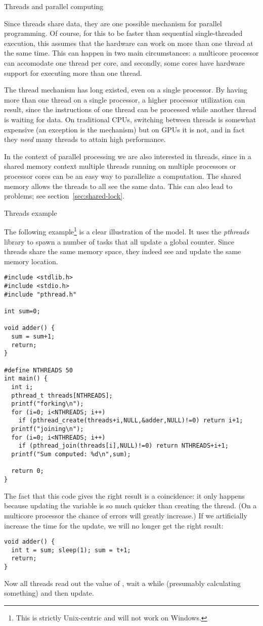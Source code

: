  {Threads and parallel computing}

Since threads share data, they are one possible mechanism for parallel programming.
Of course, for this to be faster than sequential single-threaded execution,
this assumes that the hardware can work on more than one
thread at the same time. This can happen in two main circumstances:
a multicore processor can accomodate one thread per core,
and secondly, some cores have hardware support for executing more
than one thread.

The thread mechanism has long existed, even on a single processor. By having more
than one thread on a single processor, a higher processor utilization
can result, since the instructions of one thread can be processed
while another thread is waiting for data.  On traditional CPUs,
switching between threads is somewhat expensive (an exception is the
 mechanism) but on \acp{GPU} it is not, and
in fact they \emph{need} many threads to attain high performance.

In the context of parallel processing we are also interested in
threads, since in a shared memory context multiple threads running on
multiple processors or processor cores can be an easy way to
parallelize a computation. The shared memory allows the threads to all
see the same data. This can also lead to problems; see
section~\ref{sec:shared-lock}.

 {Threads example}
\label{sec:thread-example}

The following example\footnote{This is strictly Unix-centric and will
  not work on Windows.} is a clear illustration of the  model.
It uses the \emph{pthreads} library to spawn
a number of tasks that all update a global counter. Since threads
share the same memory space, they indeed see and update the same
memory location.
\begin{verbatim}
#include <stdlib.h>
#include <stdio.h>
#include "pthread.h"

int sum=0;

void adder() {
  sum = sum+1;
  return;
}

#define NTHREADS 50
int main() {
  int i;
  pthread_t threads[NTHREADS];
  printf("forking\n");
  for (i=0; i<NTHREADS; i++)
    if (pthread_create(threads+i,NULL,&adder,NULL)!=0) return i+1;
  printf("joining\n");
  for (i=0; i<NTHREADS; i++)
    if (pthread_join(threads[i],NULL)!=0) return NTHREADS+i+1;
  printf("Sum computed: %d\n",sum);

  return 0;
}
\end{verbatim}
The fact that this code gives the right result is a
coincidence: it
only happens because updating the variable is so much quicker than
creating the thread. (On a multicore processor the chance of errors
will greatly increase.) If we artificially increase the time for the
update, we will no longer get the right result:
\begin{verbatim}
void adder() {
  int t = sum; sleep(1); sum = t+1;
  return;
}
\end{verbatim}
Now all threads read out the value of , wait a while
(presumably calculating something) and then update.

